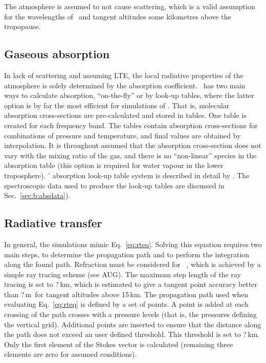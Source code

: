 The atmosphere is assumed to not cause scattering, which is a valid assumption
for the wavelengths of \smr\ and tangent altitudes some kilometres above the
tropopause. 


\subsection{Gaseous absorption}
%
In lack of scattering and assuming LTE, the local radiative properties of the
atmosphere is solely determined by the absorption coefficient. \ARTS\ has two
main ways to calculate absorption, ``on-the-fly'' or by look-up tables, where
the latter option is by far the most efficient for simulations of \smr. That
is, molecular absorption cross-sections are pre-calculated and stored in
tables. One table is created for each frequency band. The tables contain
absorption cross-sections for combinations of pressure and temperature, and
final values are obtained by interpolation. It is throughout assumed that the
absorption cross-section does not vary with the mixing ratio of the gas, and
there is no ``non-linear'' species in the absorption table (this option is
required for water vapour in the lower troposphere).
\ARTS' absorption look-up table system is described in detail by
\citet{buehler:absor:11}. The spectroscopic data used to produce the look-up
tables are discussed in Sec.~\ref{sec:b:absdata}).


\subsection{Radiative transfer}
%
In general, the simulations mimic Eq.~\ref{eq:rteq}. Solving this equation
requires two main steps, to determine the propagation path and to perform the
integration along the found path. Refraction must be considered for \smr\
\citep{eriksson:studi:02}, which is achieved by a simple ray tracing scheme
(see AUG). The maximum step length of the ray tracing is set to ?\,km, which is estimated to give a tangent point accuracy better than
?\,m\todo{Add value}\ for tangent altitudes above 15\,km.
The propagation path used when evaluating Eq.~\ref{eq:rteq} is defined by a set
of points. A point is added at each crossing of the path crosses with a
pressure levels (that is, the pressures defining the vertical grid). Additional
points are inserted to ensure that the distance along the path does not exceed
an user defined threshold. This threshold is set to ?\,km\todo{Create test for
  this.}. Only the first element of the Stokes vector is calculated (remaining
three elements are zero for assumed conditions).


